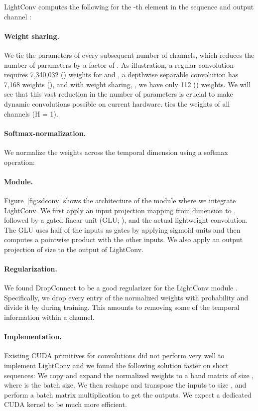 \documentclass{article} \usepackage{iclr2019_conference,times}
\def\sdconvfull{lightweight convolution}
\def\sdconv{LightConv}
\begin{document}
\sdconv{} computes the following for the -th element in the sequence and output channel :



\paragraph{Weight sharing.} 
We tie the parameters of every subsequent number of  channels, which reduces the number of parameters by a factor of . 
As illustration, a regular convolution requires 7,340,032 () weights for  and , a depthwise separable convolution has 7,168 weights (), and with weight sharing, , we have only 112 () weights. 
We will see that this vast reduction in the number of parameters is crucial to make dynamic convolutions possible on current hardware.
\citet{wang2018smoothed} ties the weights of all channels (H = 1).

\paragraph{Softmax-normalization.}
We normalize the weights  across the temporal dimension  using a softmax operation:


\paragraph{Module.} Figure~\ref{fig:sdconv} shows the architecture of the module where we integrate \sdconv{}. 
We first apply an input projection mapping from dimension  to , followed by a gated linear unit (GLU;  \citealt{dauphin2017convlm}), and the actual \sdconvfull{}.
The GLU uses half of the inputs as gates by applying sigmoid units and then computes a pointwise product with the other inputs.
We also apply an output projection of size  to the output of \sdconv{}.

\paragraph{Regularization. }
We found DropConnect to be a good regularizer for the \sdconv{} module \citep{wan2013regularization}.
Specifically, we drop every entry of the normalized weights  with probability  and divide it by  during training. 
This amounts to removing some of the temporal information within a channel.

\paragraph{Implementation.}
Existing CUDA primitives for convolutions did not perform very well to implement \sdconv{} and we found the following solution faster on short sequences:
We copy and expand the normalized weights  to a band matrix of size , where  is the batch size.
We then reshape and transpose the inputs to size , and perform a batch matrix multiplication to get the outputs.
We expect a dedicated CUDA kernel to be much more efficient.
 
\end{document}
